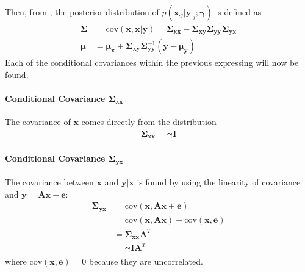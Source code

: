 Then, from \cite{conditional_cov} , the posterior distribution of $p\left( \mathbf{x}_{\cdot j} \vert \mathbf{y}_{\cdot j} ; \boldsymbol{\gamma} \right)$ is defined as
\begin{align*}
\boldsymbol{\Sigma} &= \text{cov}(\mathbf{x} , \mathbf{x} \vert \mathbf{y}) = \boldsymbol{\Sigma}_{\mathbf{xx}} - \boldsymbol{\Sigma}_{\mathbf{xy}} \boldsymbol{\Sigma}_{\mathbf{yy}}^{-1} \boldsymbol{\Sigma}_{\mathbf{yx}} \\
\boldsymbol{\mu} &= \boldsymbol{\mu}_{\mathbf{x}} + \boldsymbol{\Sigma}_{\mathbf{xy}} \boldsymbol{\Sigma}_{\mathbf{yy}}^{-1} (\mathbf{y} - \boldsymbol{\mu}_{\mathbf{y}})
\end{align*}
Each of the conditional covariances within the previous expressing will now be found.

\paragraph{Conditional Covariance $\boldsymbol{\Sigma}_{\mathbf{xx}}$}
The covariance of $\mathbf{x}$ comes directly from the distribution  
\begin{align*}
\boldsymbol{\Sigma}_{\mathbf{xx}} = \boldsymbol{\gamma} \mathbf{I}
\end{align*} 

\paragraph{Conditional Covariance $\boldsymbol{\Sigma}_{\mathbf{yx}}$}
The covariance between $\mathbf{x}$ and $\mathbf{y} \vert \mathbf{x}$ is found by using the linearity of covariance and $\mathbf{y} = \mathbf{Ax} + \mathbf{e}$:
\begin{align*}
\boldsymbol{\Sigma}_{\mathbf{yx}} &= \text{cov} \left(\mathbf{x} , \mathbf{Ax} + \mathbf{e} \right) \\ 
&= \text{cov} \left(\mathbf{x} , \mathbf{Ax} \right) + \text{cov} \left(\mathbf{x} , \mathbf{e} \right) \\
&= \boldsymbol{\Sigma}_{\mathbf{xx}} \mathbf{A}^T \\
&= \boldsymbol{\gamma} \mathbf{I} \mathbf{A}^T
\end{align*}
where $\text{cov} \left(\mathbf{x} , \mathbf{e} \right) = 0$ because they are uncorrelated.

